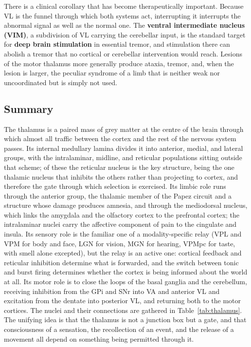 \documentclass[11pt]{article}
\begin{document}
There is a clinical corollary that has become therapeutically important. Because VL is the funnel through which both systems act, interrupting it interrupts the abnormal signal as well as the normal one. The \textbf{ventral intermediate nucleus (VIM)}, a subdivision of VL carrying the cerebellar input, is the standard target for \textbf{deep brain stimulation} in essential tremor, and stimulation there can abolish a tremor that no cortical or cerebellar intervention would reach. Lesions of the motor thalamus more generally produce ataxia, tremor, and, when the lesion is larger, the peculiar syndrome of a limb that is neither weak nor uncoordinated but is simply not used.

\subsection{Summary}

The thalamus is a paired mass of grey matter at the centre of the brain through which almost all traffic between the cortex and the rest of the nervous system passes. Its internal medullary lamina divides it into anterior, medial, and lateral groups, with the intralaminar, midline, and reticular populations sitting outside that scheme; of these the reticular nucleus is the key structure, being the one thalamic nucleus that inhibits the others rather than projecting to cortex, and therefore the gate through which selection is exercised. Its limbic role runs through the anterior group, the thalamic member of the Papez circuit and a structure whose damage produces amnesia, and through the mediodorsal nucleus, which links the amygdala and the olfactory cortex to the prefrontal cortex; the intralaminar nuclei carry the affective component of pain to the cingulate and insula. Its sensory role is the familiar one of a modality-specific relay (VPL and VPM for body and face, LGN for vision, MGN for hearing, VPMpc for taste, with smell alone excepted), but the relay is an active one: cortical feedback and reticular inhibition determine what is forwarded, and the switch between tonic and burst firing determines whether the cortex is being informed about the world at all. Its motor role is to close the loops of the basal ganglia and the cerebellum, receiving inhibition from the GPi and SNr into VA and anterior VL and excitation from the dentate into posterior VL, and returning both to the motor cortices. The nuclei and their connections are gathered in Table~\ref{tab:thalamus}. The unifying idea is that the thalamus is not a junction box but a gate, and that consciousness of a sensation, the recollection of an event, and the release of a movement all depend on something being permitted through it.
\end{document}

